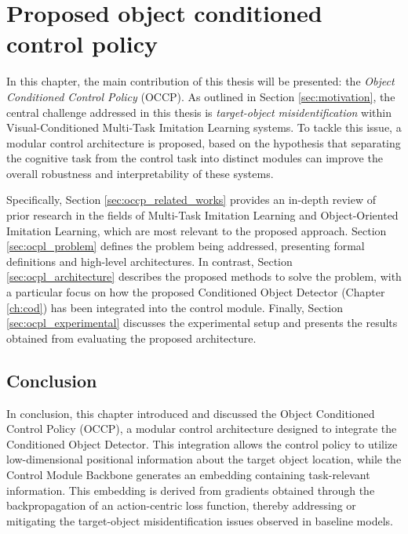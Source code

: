 \chapter{Proposed object conditioned control policy}
\label{ch:occp}
In this chapter, the main contribution of this thesis will be presented: the \textit{Object Conditioned Control Policy} (OCCP). As outlined in Section \ref{sec:motivation}, the central challenge addressed in this thesis is \textit{target-object misidentification} within Visual-Conditioned Multi-Task Imitation Learning systems. To tackle this issue, a modular control architecture is proposed, based on the hypothesis that separating the cognitive task from the control task into distinct modules can improve the overall robustness and interpretability of these systems. 

Specifically, Section \ref{sec:occp_related_works} provides an in-depth review of prior research in the fields of Multi-Task Imitation Learning and Object-Oriented Imitation Learning, which are most relevant to the proposed approach. Section \ref{sec:ocpl_problem} defines the problem being addressed, presenting formal definitions and high-level architectures. In contrast, Section \ref{sec:ocpl_architecture} describes the proposed methods to solve the problem, with a particular focus on how the proposed Conditioned Object Detector (Chapter \ref{ch:cod}) has been integrated into the control module. Finally, Section \ref{sec:ocpl_experimental} discusses the experimental setup and presents the results obtained from evaluating the proposed architecture.







\section{Conclusion}
In conclusion, this chapter introduced and discussed the Object Conditioned Control Policy (OCCP), a modular control architecture designed to integrate the Conditioned Object Detector. This integration allows the control policy to utilize low-dimensional positional information about the target object location, while the Control Module Backbone generates an embedding containing task-relevant information. This embedding is derived from gradients obtained through the backpropagation of an action-centric loss function, thereby addressing or mitigating the target-object misidentification issues observed in baseline models.

